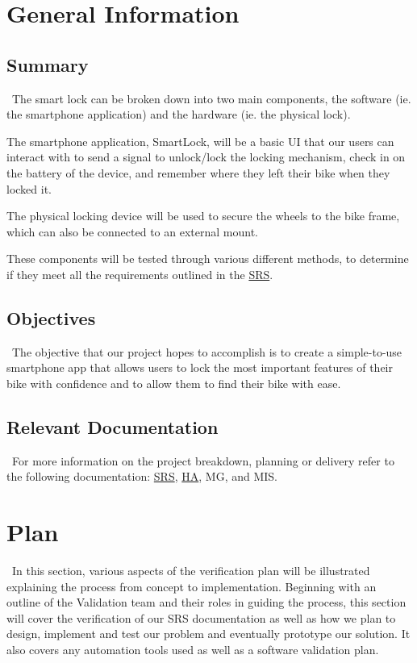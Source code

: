\documentclass[12pt, titlepage]{article}
\begin{document}
\section{General Information}

\subsection{Summary}
\-\
The smart lock can be broken down into two main components, the software (ie. the smartphone application) and the hardware (ie. the physical lock).

The smartphone application, SmartLock, will be a basic UI that our users can interact with to send a signal to unlock/lock the locking mechanism, check in on the battery of the device, and remember where they left their bike when they locked it.

The physical locking device will be used to secure the wheels to the bike frame, which can also be connected to an external mount.

These components will be tested through various different methods, to determine if they meet all the requirements outlined in the \href{https://github.com/NevoAbigail/Capstone/blob/main/docs/SRS/SRS.pdf}{SRS}.

\subsection{Objectives}
\-\
The objective that our project hopes to accomplish is to create a simple-to-use smartphone app that allows users to lock the most important features of their bike with confidence and to allow them to find their bike with ease.

\subsection{Relevant Documentation}
\-\
For more information on the project breakdown, planning or delivery refer to the following documentation:
 \href{https://github.com/NevoAbigail/Capstone/blob/main/docs/SRS/SRS.pdf}{SRS},
 \href{https://github.com/NevoAbigail/Capstone/blob/main/docs/HazardAnalysis/HazardAnalysis.pdf}{HA}, MG, and MIS.
 

\section{Plan}
\-\
In this section, various aspects of the verification plan will be illustrated explaining the process from concept to implementation. Beginning with an outline of the Validation team and their roles in guiding the process, this section will cover the verification of our SRS documentation as well as how we plan to design, implement and test our problem and eventually prototype our solution. It also covers any automation tools used as well as a software validation plan.
\end{document}
